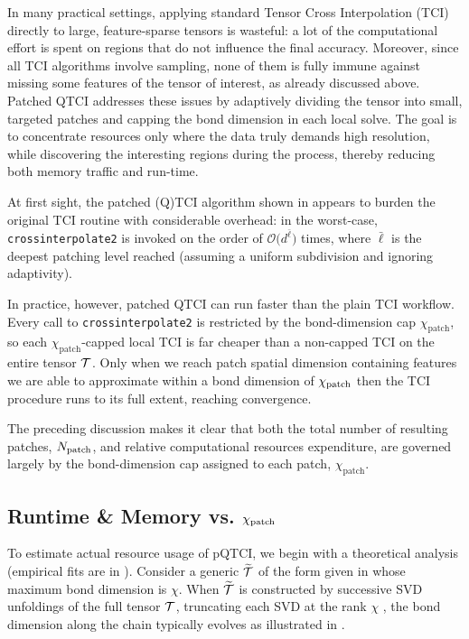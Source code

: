 In many practical settings, applying standard Tensor Cross Interpolation (TCI) directly to large, feature-sparse tensors is wasteful: a lot of the computational effort is spent on regions that do not influence the final accuracy. Moreover,
since all TCI algorithms involve sampling, none of them is fully immune against missing some features of the tensor of interest, as already discussed above. Patched QTCI addresses these issues by adaptively dividing the tensor into small, targeted patches and capping the bond dimension in each local solve. The goal is to concentrate resources only where the data truly demands high resolution, while discovering the interesting regions during the process, thereby reducing both memory traffic and run-time.

At first sight, the patched (Q)TCI algorithm shown in  appears to burden the original TCI routine with considerable overhead: in the worst-case, \texttt{crossinterpolate2} is invoked on the order of $\mathcal{O}\bigl(d^{\bar\ell}\bigr)$ times, where $\bar\ell$ is the deepest patching level reached (assuming a uniform subdivision and ignoring adaptivity).

In practice, however, patched QTCI can run faster than the plain TCI workflow. Every call to \texttt{crossinterpolate2} is restricted by the bond-dimension cap $\chi_{\text{patch}}$, so each $\chi_{\text{patch}}$-capped local TCI is far cheaper than a non-capped TCI on the entire tensor $\mathcal{T}$. Only when we reach patch spatial dimension containing features we are able to approximate within a bond dimension of $\chi_{\text{patch}}$ then the TCI procedure runs to its full extent, reaching convergence. 

The preceding discussion makes it clear that both the total number of resulting patches, $N_{\text{patch}}$, and relative computational resources expenditure, are governed largely by the bond-dimension cap assigned to each patch, $\chi_{\text{patch}}$. 

\subsection{Runtime \& Memory vs. $\chi_{\text{patch}}$}

To estimate actual resource usage of pQTCI, we begin with a theoretical analysis (empirical fits are in ). 
Consider a generic $\widetilde{\mathcal{T}}$ of the form given in  whose maximum bond dimension is $\chi$. When $\widetilde{\mathcal{T}}$ is constructed by successive SVD unfoldings of the full tensor $\mathcal{T}$, truncating each SVD at the rank $\chi$ \cite{vonDelftTNNotes, Fannes1992, tensornetwork.org}, the bond dimension along the chain typically evolves  as illustrated in .

